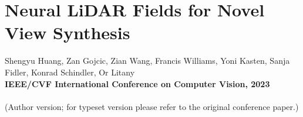 \chapter[Neural LiDAR Fields for Novel View Synthesis]{Neural LiDAR Fields for Novel View Synthesis}
\label{chap:iccv23}

Shengyu Huang, Zan Gojcic, Zian Wang, Francis Williams, Yoni Kasten, Sanja Fidler, Konrad Schindler, Or Litany\\
\textbf{IEEE/CVF International Conference on Computer Vision, 2023}\\
\\
(Author version; for typeset version please refer to the original conference paper.)\\

\providecommand{\subdir}{.}
\graphicspath{{\subdir/}}


\newpage







\newpage
\newcommand{\manuallabel}[2]{\def\@currentlabel{#2}\label{#1}}
\makeatother
\manuallabel{eq:loss_function}{Eq.~(15)}
